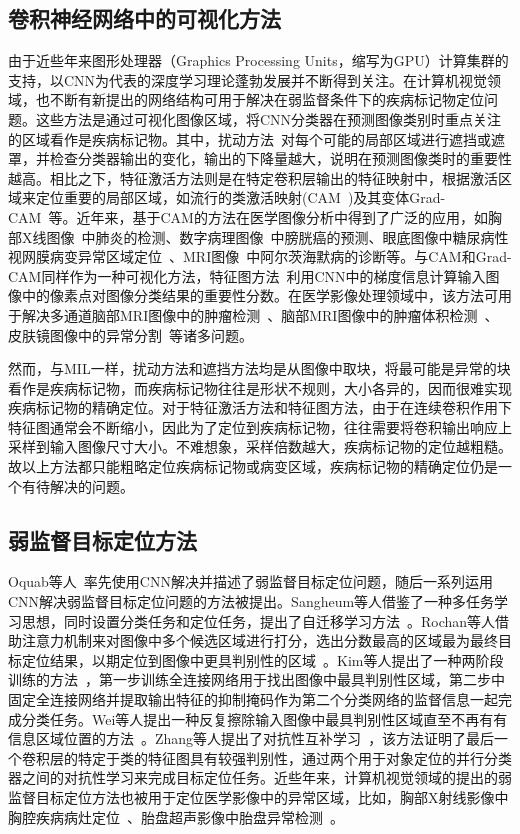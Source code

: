 \subsection{卷积神经网络中的可视化方法}
由于近些年来图形处理器（Graphics Processing Units，缩写为GPU）计算集群的支持，以CNN为代表的深度学习理论蓬勃发展并不断得到关注。在计算机视觉领域，也不断有新提出的网络结构可用于解决在弱监督条件下的疾病标记物定位问题。这些方法是通过可视化图像区域，将CNN分类器在预测图像类别时重点关注的区域看作是疾病标记物。其中，扰动方法~\cite{zintgraf2017visualizing}对每个可能的局部区域进行遮挡或遮罩，并检查分类器输出的变化，输出的下降量越大，说明在预测图像类时的重要性越高。相比之下，特征激活方法则是在特定卷积层输出的特征映射中，根据激活区域来定位重要的局部区域，如流行的类激活映射(CAM~\cite{zhou2016learning})及其变体Grad-CAM~\cite{selvaraju2017grad}等。近年来，基于CAM的方法在医学图像分析中得到了广泛的应用，如胸部X线图像~\cite{rajpurkar2017chexnet}中肺炎的检测、数字病理图像~\cite{zhang2017mdnet}中膀胱癌的预测、眼底图像中糖尿病性视网膜病变异常区域定位~\cite{Gondaletal17}、MRI图像~\cite{yang2018visual}中阿尔茨海默病的诊断等。与CAM和Grad-CAM同样作为一种可视化方法，特征图方法~\cite{simonyan2013deep}利用CNN中的梯度信息计算输入图像中的像素点对图像分类结果的重要性分数。在医学影像处理领域中，该方法可用于解决多通道脑部MRI图像中的肿瘤检测~\cite{banerjee2016novel}、脑部MRI图像中的肿瘤体积检测~\cite{mitra2017volumetric}、皮肤镜图像中的异常分割~\cite{jahanifar2018supervised}等诸多问题。

然而，与MIL一样，扰动方法和遮挡方法均是从图像中取块，将最可能是异常的块看作是疾病标记物，而疾病标记物往往是形状不规则，大小各异的，因而很难实现疾病标记物的精确定位。对于特征激活方法和特征图方法，由于在连续卷积作用下特征图通常会不断缩小，因此为了定位到疾病标记物，往往需要将卷积输出响应上采样到输入图像尺寸大小。不难想象，采样倍数越大，疾病标记物的定位越粗糙。故以上方法都只能粗略定位疾病标记物或病变区域，疾病标记物的精确定位仍是一个有待解决的问题。

\subsection{弱监督目标定位方法}

Oquab等人~\cite{Oquab2015IsOL}率先使用CNN解决并描述了弱监督目标定位问题，随后一系列运用CNN解决弱监督目标定位问题的方法被提出。Sangheum等人借鉴了一种多任务学习思想，同时设置分类任务和定位任务，提出了自迁移学习方法~\cite{2015Hwang}。Rochan等人借助注意力机制来对图像中多个候选区域进行打分，选出分数最高的区域最为最终目标定位结果，以期定位到图像中更具判别性的区域~\cite{BMVC2016_52}。Kim等人提出了一种两阶段训练的方法~\cite{Kim_2017_ICCV}，第一步训练全连接网络用于找出图像中最具判别性区域，第二步中固定全连接网络并提取输出特征的抑制掩码作为第二个分类网络的监督信息一起完成分类任务。Wei等人提出一种反复擦除输入图像中最具判别性区域直至不再有有信息区域位置的方法~\cite{WeiFLCZY17}。Zhang等人提出了对抗性互补学习~\cite{ZhangWF0H18}，该方法证明了最后一个卷积层的特定于类的特征图具有较强判别性，通过两个用于对象定位的并行分类器之间的对抗性学习来完成目标定位任务。近些年来，计算机视觉领域的提出的弱监督目标定位方法也被用于定位医学影像中的异常区域，比如，胸部X射线影像中胸腔疾病病灶定位~\cite{WangPLLBS17}、胎盘超声影像中胎盘异常检测~\cite{Qi2017}。

